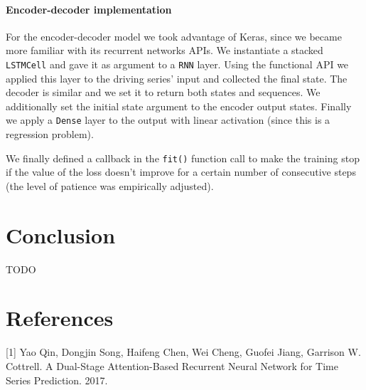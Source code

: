 \documentclass{article}
\begin{document}
\paragraph{Encoder-decoder implementation}

For the encoder-decoder model we took advantage of Keras, since we became more
familiar with its recurrent networks APIs. We instantiate a stacked 
\texttt{LSTMCell} and gave it as argument to a \texttt{RNN} layer. Using the 
functional API we applied this layer to the driving series' input and collected
the final state. The decoder is similar and we set it to return both states and 
sequences. We additionally set the initial state argument to the encoder output 
states. Finally we apply a \texttt{Dense} layer to the output with linear 
activation (since this is a regression problem).

We finally defined a callback in the \texttt{fit()} function call to make the
training stop if the value of the loss doesn't improve for a certain number of 
consecutive steps (the level of patience was empirically adjusted).

\section{Conclusion}

TODO

\section*{References}

\small

[1] Yao Qin, Dongjin Song, Haifeng Chen, Wei Cheng, Guofei Jiang, Garrison W.
Cottrell. A Dual-Stage Attention-Based Recurrent Neural Network for Time Series
Prediction. 2017.
\end{document}
